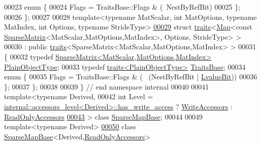 \begin{DoxyCode}
00023   \textcolor{keyword}{enum} \{
00024     Flags = TraitsBase::Flags & (~NestByRefBit)
00025   \};
00026 \};
00027 
00028 \textcolor{keyword}{template}<\textcolor{keyword}{typename} MatScalar, \textcolor{keywordtype}{int} MatOptions, \textcolor{keyword}{typename} MatIndex, \textcolor{keywordtype}{int} Options, \textcolor{keyword}{typename} Str\textcolor{keywordtype}{id}eType>
\hyperlink{struct_eigen_1_1internal_1_1traits_3_01_map_3_01const_01_sparse_matrix_3_01_mat_scalar_00_01_matec7066c11e5361dce6e4102c84e4bcd2}{00029} \textcolor{keyword}{struct }\hyperlink{struct_eigen_1_1internal_1_1traits}{traits}<\hyperlink{group___core___module_class_eigen_1_1_map}{Map}<const \hyperlink{group___sparse_core___module_class_eigen_1_1_sparse_matrix}{SparseMatrix}<MatScalar,MatOptions,MatIndex>, Options, 
      StrideType> >
00030   : \textcolor{keyword}{public} \hyperlink{struct_eigen_1_1internal_1_1traits}{traits}<SparseMatrix<MatScalar,MatOptions,MatIndex> >
00031 \{
00032   \textcolor{keyword}{typedef} \hyperlink{group___sparse_core___module_class_eigen_1_1_sparse_matrix}{SparseMatrix<MatScalar,MatOptions,MatIndex>} 
      \hyperlink{group___sparse_core___module_class_eigen_1_1_sparse_matrix}{PlainObjectType};
00033   \textcolor{keyword}{typedef} \hyperlink{struct_eigen_1_1internal_1_1traits}{traits<PlainObjectType>} \hyperlink{struct_eigen_1_1internal_1_1traits}{TraitsBase};
00034   \textcolor{keyword}{enum} \{
00035     Flags = TraitsBase::Flags & (~ (NestByRefBit | \hyperlink{group__flags_gae2c323957f20dfdc6cb8f44428eaec1a}{LvalueBit}))
00036   \};
00037 \};
00038 
00039 \} \textcolor{comment}{// end namespace internal}
00040 
00041 \textcolor{keyword}{template}<\textcolor{keyword}{typename} Derived,
00042          \textcolor{keywordtype}{int} Level = \hyperlink{struct_eigen_1_1internal_1_1accessors__level}{internal::accessors\_level<Derived>::has\_write\_access}
       ? \hyperlink{group__enums_gga9f93eac38eb83deb0e8dbd42ddf11d5da2c59ef3697d65866c3a8e16eda7881ab}{WriteAccessors} : \hyperlink{group__enums_gga9f93eac38eb83deb0e8dbd42ddf11d5da42865f87356ad7e585a1bfbfd1b81699}{ReadOnlyAccessors}
\hyperlink{class_eigen_1_1_sparse_map_base}{00043} > \textcolor{keyword}{class }\hyperlink{class_eigen_1_1_sparse_map_base}{SparseMapBase};
00044 
00049 \textcolor{keyword}{template}<\textcolor{keyword}{typename} Derived>
\hyperlink{group___sparse_core___module}{00050} \textcolor{keyword}{class }\hyperlink{class_eigen_1_1_sparse_map_base}{SparseMapBase}<Derived,\hyperlink{group__enums_gga9f93eac38eb83deb0e8dbd42ddf11d5da42865f87356ad7e585a1bfbfd1b81699}{ReadOnlyAccessors}>

\end{DoxyCode}
